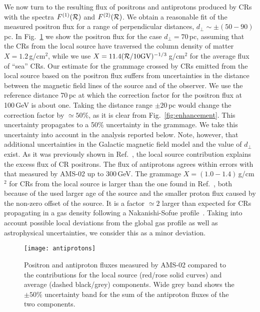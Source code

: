\documentclass[prd,aps,twocolumn]{revtex4}
\def\R{{\cal R}}
\begin{document}
We now turn to the resulting flux of positrons and antiprotons produced by 
CRs with the spectra $F^{(1)}(\R)$ and $F^{(2)}(\R)$. 
We obtain a reasonable fit of the measured positron flux for a range of
perpendicular distances, $d_\perp\sim \pm(50-90)$\,pc. 
In Fig.~\ref{fig:pos_aprot}
we show the positron flux for the case $d_\perp=70$\,pc, assuming that the CRs 
from the local source have traversed the column density of matter 
$X=1.2$\,g/cm$^2$, while we use $X=11.4(\R/10\rm{GV})^{-1/3}$\,g/cm$^2$ 
for the average flux of ``sea'' CRs.  
Our estimate for the grammage crossed by CRs emitted from the local source 
based on the positron flux suffers from uncertainties in the distance between 
the magnetic field lines of the source and of the observer. We use the 
reference distance 70\,pc at which the correction factor for 
the positron flux at 100\,GeV is about one. Taking the distance range 
$\pm 20$\,pc would change the correction factor by $\simeq 50\%$, 
as it is clear from Fig.~\ref{fig:enhancement}. This uncertainty propagates 
to a 50\% uncertainty in the grammage. We take this uncertainty into account 
in the analysis reported below. Note, however,  
that additional uncertainties in the Galactic magnetic field model and 
the value of $d_\perp$ exist.
As it was previously shown in 
Ref.~\cite{PRL}, the local source contribution explains the excess flux 
of CR positrons. The flux of antiprotons agrees within errors with that 
measured by AMS-02 up to 300\,GeV. 
The grammage  $X=(1.0-1.4)$\,g/cm$^2$ for CRs from the 
local source is larger than the one found in Ref.~\cite{PRL}, both
because of the used larger age of the source and the smaller proton flux
caused by the non-zero offset of the source. 
It is a factor $\simeq 2$ larger than expected for CRs propagating in a gas
density following a Nakanishi-Sofue profile~\cite{gas}.
Taking into account possible local deviations from the global gas profile 
as well as astrophysical uncertainties,  we consider this as a minor 
deviation.



\begin{figure}
\texttt{[image: antiprotons]}
\caption{Positron and antiproton fluxes measured by AMS-02 compared to the 
contributions for the local source (red/rose solid curves) and average (dashed black/grey) components. 
Wide grey band shows the $\pm 50\%$ uncertainty band for the sum of the 
antiproton fluxes of the two components.}
\label{fig:pos_aprot}
\end{figure}
\end{document}
